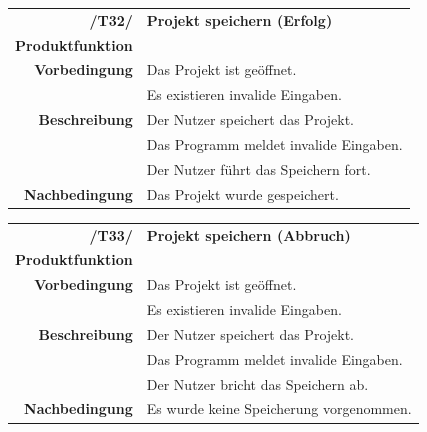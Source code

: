 \documentclass{article}
\begin{document}
\begin{table}[H]
\begin{tabularx}{\textwidth}{rX}
 \vspace{1mm}
\textbf{/T32/}         & \textbf{Projekt speichern (Erfolg)} \\ \vspace{1mm}
\textbf{Produktfunktion} & \nameref{sec:f:Projekt speichern} \\
\textbf{Vorbedingung}  & Das Projekt ist geöffnet.   \\ \vspace{1mm} & Es existieren invalide Eingaben. \\
\textbf{Beschreibung}  & Der Nutzer speichert das Projekt. \\ & Das Programm meldet invalide Eingaben. \\ \vspace{1mm} & Der Nutzer führt das Speichern fort. \\
\textbf{Nachbedingung} & Das Projekt wurde gespeichert.
\end{tabularx}
\end{table}

\begin{table}[H]
\begin{tabularx}{\textwidth}{rX}
 \vspace{1mm}
\textbf{/T33/}         & \textbf{Projekt speichern (Abbruch)} \\ \vspace{1mm}
\textbf{Produktfunktion} & \nameref{sec:f:Projekt speichern} \\
\textbf{Vorbedingung}  & Das Projekt ist geöffnet.   \\ \vspace{1mm} & Es existieren invalide Eingaben. \\
\textbf{Beschreibung}  & Der Nutzer speichert das Projekt. \\ & Das Programm meldet invalide Eingaben. \\ \vspace{1mm} & Der Nutzer bricht das Speichern ab. \\
\textbf{Nachbedingung} & Es wurde keine Speicherung vorgenommen.  
\end{tabularx}
\end{table}
\end{document}
